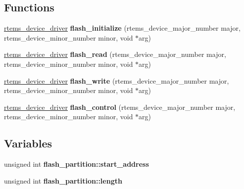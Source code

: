 \subsection*{Functions}
\begin{DoxyCompactItemize}
\item 
\mbox{\label{group__lm32__milkymist__flash_ga84fb619ffe251359d3f6b683d486f1eb}} 
\mbox{\hyperlink{group__ClassicStatus_ga545d41846817eaba6143d52ee4d9e9fe}{rtems\+\_\+device\+\_\+driver}} {\bfseries flash\+\_\+initialize} (rtems\+\_\+device\+\_\+major\+\_\+number major, rtems\+\_\+device\+\_\+minor\+\_\+number minor, void $\ast$arg)
\item 
\mbox{\label{group__lm32__milkymist__flash_ga14bbe6808b9828e49492eb4cd215dc4e}} 
\mbox{\hyperlink{group__ClassicStatus_ga545d41846817eaba6143d52ee4d9e9fe}{rtems\+\_\+device\+\_\+driver}} {\bfseries flash\+\_\+read} (rtems\+\_\+device\+\_\+major\+\_\+number major, rtems\+\_\+device\+\_\+minor\+\_\+number minor, void $\ast$arg)
\item 
\mbox{\label{group__lm32__milkymist__flash_gaf514a953b336d515e1125eb323e698b7}} 
\mbox{\hyperlink{group__ClassicStatus_ga545d41846817eaba6143d52ee4d9e9fe}{rtems\+\_\+device\+\_\+driver}} {\bfseries flash\+\_\+write} (rtems\+\_\+device\+\_\+major\+\_\+number major, rtems\+\_\+device\+\_\+minor\+\_\+number minor, void $\ast$arg)
\item 
\mbox{\label{group__lm32__milkymist__flash_gae34fea6d418b39e04b0593c7345d02e3}} 
\mbox{\hyperlink{group__ClassicStatus_ga545d41846817eaba6143d52ee4d9e9fe}{rtems\+\_\+device\+\_\+driver}} {\bfseries flash\+\_\+control} (rtems\+\_\+device\+\_\+major\+\_\+number major, rtems\+\_\+device\+\_\+minor\+\_\+number minor, void $\ast$arg)
\end{DoxyCompactItemize}
\subsection*{Variables}
\begin{DoxyCompactItemize}
\item 
\mbox{\label{group__lm32__milkymist__flash_gab2c0cc173142c1507d0b8ed79db6ccc1}} 
unsigned int {\bfseries flash\+\_\+partition\+::start\+\_\+address}
\item 
\mbox{\label{group__lm32__milkymist__flash_ga4ec4157fbfa9a2b92949621d2a439461}} 
unsigned int {\bfseries flash\+\_\+partition\+::length}
\end{DoxyCompactItemize}


